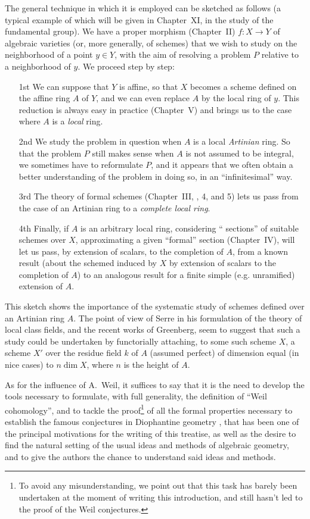 The general technique in which it is employed can be sketched as follows (a typical example of which will be given in Chapter~XI, in the study of the fundamental group).
We have a proper morphism (Chapter~II) $f:X\to Y$ of algebraic varieties (or, more generally, of schemes) that we wish to study on the neighborhood of a point $y\in Y$, with the aim of resolving a problem $P$ relative to a neighborhood of $y$.
We proceed step by step:
\begin{enumerate}
  \item[1st]
    We can suppose that $Y$ is affine, so that $X$ becomes a scheme defined on the affine ring $A$ of $Y$, and we can even replace $A$ by the local ring of $y$.
    This reduction is always easy in practice (Chapter~V) and brings us to the case where $A$ is a \emph{local} ring.
  \item[2nd]
    We study the problem in question when $A$ is a local \emph{Artinian} ring.
    So that the problem $P$ still makes sense when $A$ is not assumed to be integral, we sometimes have to reformulate $P$, and it appears that we often obtain a better understanding of the problem in doing so, in an ``infinitesimal'' way.
  \item[3rd]
    The theory of formal schemes (Chapter~III, \textsection{}, 4, and 5) lets us pass from the case of an Artinian ring to a \emph{complete local ring}.
  \item[4th]
    Finally, if $A$ is an arbitrary local ring, considering `` sections'' of suitable schemes over $X$, approximating a given ``formal'' section (Chapter~IV), will let us pass, by extension of scalars, to the completion of $A$, from a known result (about the schemed induced by $X$ by extension of scalars to the completion of $A$) to an analogous result for a finite simple (e.g. unramified) extension of $A$.
\end{enumerate}

This sketch shows the importance of the systematic study of schemes defined over an Artinian ring $A$.
The point of view of Serre in his formulation of the theory of local class fields, and the recent works of Greenberg, seem to suggest that such a study could be undertaken by functorially attaching, to some such scheme $X$, a scheme $X'$ over the residue field $k$ of $A$ (assumed perfect) of dimension equal (in nice cases) to $n\dim X$, where $n$ is the height of $A$.

As for the influence of A.~Weil, it suffices to say that it is the need to develop the tools necessary to formulate, with full generality, the definition of ``Weil cohomology'', and to tackle the proof\footnote{To avoid any misunderstanding, we point out that this task has barely been undertaken at the moment of writing this introduction, and still hasn't led to the proof of the Weil conjectures.} of all the formal properties necessary to establish the famous conjectures in Diophantine geometry \cite{I-19}, that has been one of the principal motivations for the writing of this treatise, as well as the desire to find the natural setting of the usual ideas and methods of algebraic geometry, and to give the authors the chance to understand said ideas and methods.

